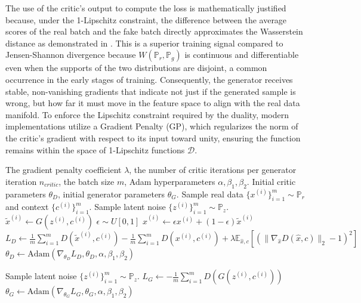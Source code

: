 The use of the critic's output to compute the loss is mathematically 
justified because, under the 1-Lipschitz constraint, 
the difference between the average scores of the real batch and 
the fake batch directly approximates the Wasserstein distance as demonstrated in \cite{background:wgan}.
This is a superior training signal compared to Jensen-Shannon divergence because
$W(\mathbb{P}_r, \mathbb{P}_g)$ is
continuous and differentiable even when the supports of the two
distributions are disjoint, a common occurrence in the early stages of training.
Consequently, the generator receives stable, non-vanishing gradients that indicate 
not just if the generated sample is wrong,
but how far it must move in the feature space to align with the real
data manifold. 
To enforce the Lipschitz constraint required by the duality, modern implementations utilize a Gradient Penalty (GP),
which regularizes the norm of the critic's gradient with respect to its input toward unity, ensuring the function remains 
within the space of 1-Lipschitz functions $\mathcal{D}$.

\begin{algorithm}[H]
\caption{Conditional Wasserstein GAN with Gradient Penalty (CWGAN-GP)}
\label{alg:cwgan_gp}
\begin{algorithmic}[1]
\REQUIRE The gradient penalty coefficient $\lambda$, the number of critic iterations per generator iteration $n_{critic}$, the batch size $m$, Adam hyperparameters $\alpha, \beta_1, \beta_2$.
\REQUIRE Initial critic parameters $\theta_D$, initial generator parameters $\theta_G$.
        \STATE Sample real data $\{x^{(i)}\}_{i=1}^m \sim \mathbb{P}_r$ and context $\{c^{(i)}\}_{i=1}^m$.
        \STATE Sample latent noise $\{z^{(i)}\}_{i=1}^m \sim \mathbb{P}_z$.
        \STATE $\tilde{x}^{(i)} \leftarrow G(z^{(i)}, c ^{(i)})$ 
        \STATE $\epsilon \sim U[0, 1]$ 
        \STATE $\hat{x}^{(i)} \leftarrow \epsilon x^{(i)} + (1 - \epsilon) \tilde{x}^{(i)}$  
        \STATE $L_{D} \leftarrow \frac{1}{m} \sum_{i=1}^m D(\tilde{x}^{(i)}, c^{(i)}) - \frac{1}{m} \sum_{i=1}^m D(x^{(i)}, c^{(i)}) + \lambda \mathbb{E}_{\hat{x}, c} [(\|\nabla_{\hat{x}} D(\hat{x}, c)\|_2 - 1)^2]$  
        \STATE $\theta_D \leftarrow \text{Adam}(\nabla_{\theta_D} L_{D}, \theta_D, \alpha, \beta_1, \beta_2)$
    \ENDFOR
    
    \STATE Sample latent noise $\{z^{(i)}\}_{i=1}^m \sim \mathbb{P}_z$.
    \STATE $L_{G} \leftarrow -\frac{1}{m} \sum_{i=1}^m D(G(z^{(i)}, c^{(i)}))$
    \STATE $\theta_G \leftarrow \text{Adam}(\nabla_{\theta_G} L_{G}, \theta_G, \alpha, \beta_1, \beta_2)$
\ENDWHILE
\end{algorithmic}
\end{algorithm}

